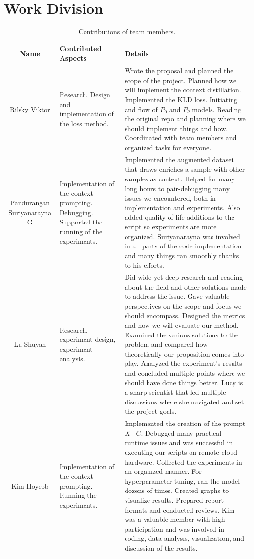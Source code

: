 \documentclass[10pt,twocolumn,letterpaper]{article}
\begin{document}
\newpage
\newpage
\section{Work Division}

\begin{table}
   \begin{center}
   \begin{tabular}{|c|p{4cm}|p{8cm}|}
   \hline
   Name & Contributed Aspects & Details \\
   \hline
   \hline
   Rilsky Viktor & Research. Design and implementation of the loss method. & Wrote the proposal and planned the scope of the project. Planned how we will implement the context distillation. Implemented the KLD loss. Initiating and flow of $P_0$ and $P_\theta$ models. Reading the original repo and planning where we should implement things and how. Coordinated with team members and organized tasks for everyone. \\
   \hline
   Pandurangan Suriyanarayna G & Implementation of the context prompting. Debugging. Supported the running of the experiments. &   Implemented the augmented dataset that draws enriches a sample with other samples as context. Helped for many long hours to pair-debugging many issues we encountered, both in implementation and experiments. Also added quality of life additions to the script so experiments are more organized. Suriyanarayna was involved in all parts of the code implementation and many things ran smoothly thanks to his efforts. \\
   \hline
   Lu Shuyan & Research, experiment design, experiment analysis.  & Did wide yet deep research and reading about the field and other solutions made to address the issue. Gave valuable perspectives on the scope and focus we should encompass. Designed the metrics and how we will evaluate our method. Examined the various solutions to the problem and compared how theoretically our proposition comes into play. Analyzed the experiment's results and concluded multiple points where we should have done things better. Lucy is a sharp scientist that led multiple discussions where she navigated and set the project goals. \\
   \hline
   Kim Hoyeob  & Implementation of the context prompting. Running the experiments. & Implemented the creation of the prompt $X \mid C$. Debugged many practical runtime issues and was successful in executing our scripts on remote cloud hardware. Collected the experiments in an organized manner. For hyperparameter tuning, ran the model dozens of times. Created graphs to visualize results. Prepared report formats and conducted reviews. Kim was a valuable member with high participation and was involved in coding, data analysis, visualization, and discussion of the results.

   \\
   \hline
   \end{tabular}
   \end{center}
   \caption{Contributions of team members.}
   \label{tab:contributions}
   \end{table}





{\small


}
\end{document}

